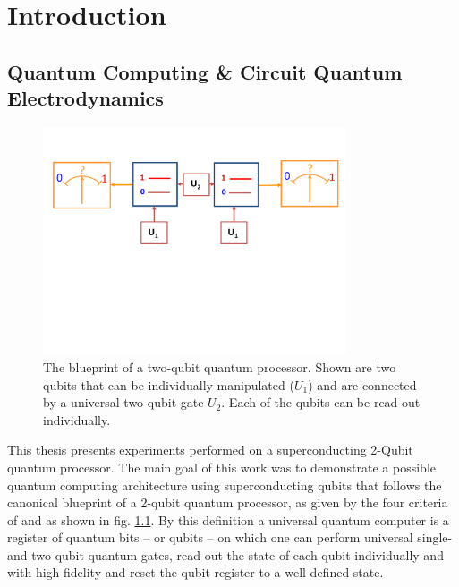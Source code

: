 \chapter{Introduction}


\section{Quantum Computing \& Circuit Quantum Electrodynamics}

\begin{figure}
	\centering
		\includegraphics[width=0.8\textwidth]{./material/papers/grover/submission1/Fig1}
	\caption[Blueprint of a two-qubit quantum processor]{The blueprint of a two-qubit quantum processor. Shown are two qubits that can be individually manipulated ($U_1$) and are connected by a universal two-qubit gate $U_2$. Each of the qubits can be read out individually.}
	\label{fig:qubit_processor_blueprint}
\end{figure}

This thesis presents experiments performed on a superconducting 2-Qubit quantum processor. The main goal of this work was to demonstrate a possible quantum computing architecture using superconducting qubits that follows the canonical blueprint of a 2-qubit quantum processor, as given by the four criteria of \cite{divincenzo_physical_2000} and as shown in fig. \ref{fig:qubit_processor_blueprint}. By this definition a universal quantum computer is a register of quantum bits -- or qubits -- on which one can perform universal single- and two-qubit quantum gates, read out the state of each qubit individually and with high fidelity and reset the qubit register to a well-defined state.

